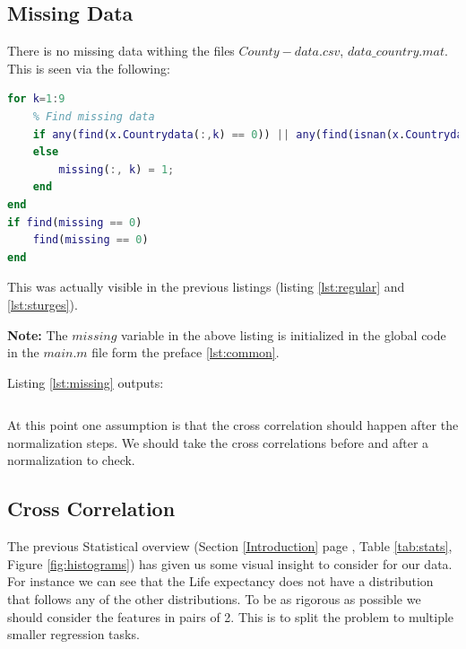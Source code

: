 \documentclass[12pt, a4paper]{article}
\begin{document}
\subsection{Missing Data}

There is no missing data withing the files $County-data.csv$, $data\_country.mat$. This is seen via the following:
\newline

\begin{lstlisting}[language=Matlab, label=lst:missing, caption=Code that find if missing data exists.]
for k=1:9
    % Find missing data
    if any(find(x.Countrydata(:,k) == 0)) || any(find(isnan(x.Countrydata(:,k)))) || any(find(x.Countrydata(:,k) == missing))
    else
        missing(:, k) = 1;
    end
end
if find(missing == 0)
    find(missing == 0)
end
\end{lstlisting}

This was actually visible in the previous listings (listing \ref{lst:regular} and \ref{lst:sturges}).
\newline

\textbf{Note:} The $missing$ variable in the above listing is initialized in the global code in the $main.m$ file form the preface \ref{lst:common}.
\newline

Listing \ref{lst:missing} outputs:
\newline

\begin{lstlisting}[language=Matlab, label=lst:missing output, caption=Missing data matrix.]
% No output
\end{lstlisting}

At this point one assumption is that the cross correlation should happen after the normalization steps. We should take the cross correlations before and after a normalization to check.

\subsection{Cross Correlation}

The previous Statistical overview (Section \ref{Introduction} page \pageref{Introduction}, Table \ref{tab:stats}, Figure \ref{fig:histograms}) has given us some visual insight to consider for our data. For instance we can see that the Life expectancy does not have a distribution that follows any of the other distributions. To be as rigorous as possible we should consider the features in pairs of 2. This is to split the problem to multiple smaller regression tasks.
\newline
\end{document}
